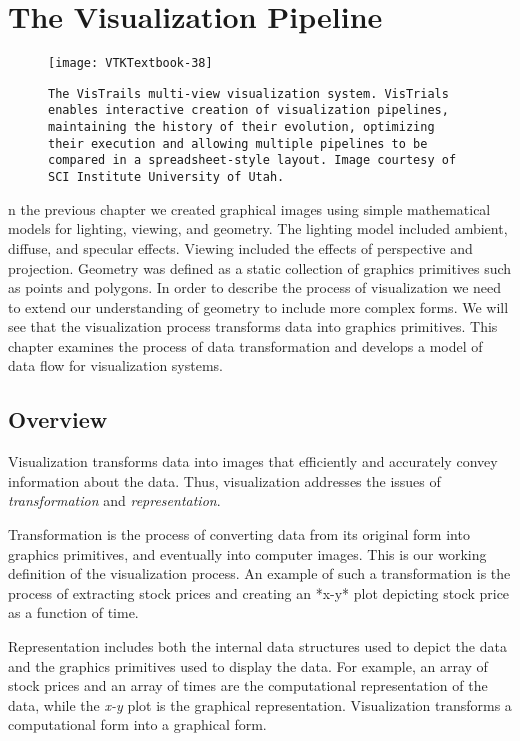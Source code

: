\chapter{The Visualization Pipeline}
\label{chap:visualization_pipeline}

\begin{figure}[ht]
	\hfill
	\begin{minipage}{0.5\textwidth}
		\centering
		\texttt{[image: VTKTextbook-38]}\\
		\caption*{\texttt{The VisTrails multi-view visualization system.
				VisTrials enables interactive creation of visualization pipelines, maintaining the history of their evolution, optimizing their execution and allowing multiple pipelines to be compared in a spreadsheet-style layout.
				Image courtesy of SCI Institute University of Utah.}}
	\end{minipage}
\end{figure}

n the previous chapter we created graphical images using simple mathematical models for lighting, viewing, and geometry.
The lighting model included ambient, diffuse, and specular effects.
Viewing included the effects of perspective and projection.
Geometry was defined as a static collection of graphics primitives such as points and polygons.
In order to describe the process of visualization we need to extend our understanding of geometry to include more complex forms.
We will see that the visualization process transforms data into graphics primitives.
This chapter examines the process of data transformation and develops a model of data flow for visualization systems.

\section {Overview}
Visualization transforms data into images that efficiently and accurately convey information about the data.
Thus, visualization addresses the issues of \emph{transformation} and \emph{representation}.

Transformation is the process of converting data from its original form into graphics primitives, and eventually into computer images. This is our working definition of the visualization process. An example of such a transformation is the process of extracting stock prices and creating an *x-y* plot depicting stock price as a function of time.

Representation includes both the internal data structures used to depict the data and the graphics primitives used to display the data. For example, an array of stock prices and an array of times are the computational representation of the data, while the \emph{x-y} plot is the graphical representation. Visualization transforms a computational form into a graphical form.


